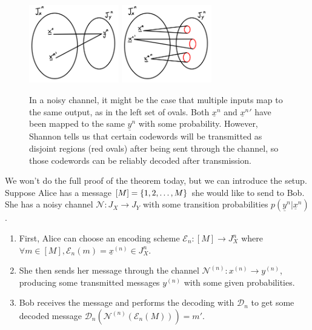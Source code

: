 \begin{figure}
    \centering
    \includegraphics[width=0.35\textwidth]{lent/qi/2019/01/20190125_noisychannel1.png}
    \includegraphics[width=0.35\textwidth]{lent/qi/2019/01/20190125_noisychannel2.png}
    \caption{In a noisy channel, it might be the case that multiple inputs map to the same output, as in the left set of ovals. Both $\underline{x}^n$ and $\underline{x}^n{}'$ have been mapped to the same $\underline{y}^n$ with some probability. However, Shannon tells us that certain codewords will be transmitted as disjoint regions (red ovals) after being sent through the channel, so those codewords can be reliably decoded after transmission.}
    \label{fig:noisychannel}
\end{figure}

We won't do the full proof of the theorem today, but we can introduce the setup. Suppose Alice has a message $[M]=\{1,2,\ldots, M\}$ she would like to send to Bob. She has a noisy channel $\mathcal{N}:J_X \to J_Y$ with some transition probabilities $p(\underline y^{n}| \underline x^{n})$.



\begin{enumerate}
    \item First, Alice can choose an encoding scheme $\mathcal{E}_n:[M]\to J_X^n$ where $\forall m\in [M], \mathcal{E}_n(m)=\underline x^{(n)} \in J_X^n$.
    \item She then sends her message through the channel $\mathcal{N}^{(n)}:x^{(n)}\to y^{(n)}$, producing some transmitted messages $y^{(n)}$ with some given probabilities.
    \item Bob receives the message and performs the decoding with $\mathcal{D}_n$ to get some decoded message $\mathcal{D}_n(\mathcal{N}^{(n)}(\mathcal{E}_n(M)))=m'$.
\end{enumerate}

